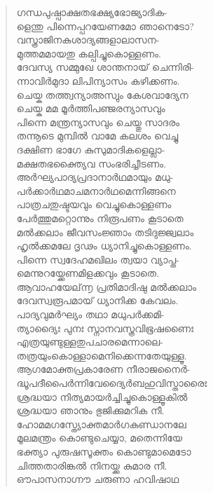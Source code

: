 \begin{verse}
ഗന്ധപുഷ്പാക്ഷതഭക്ഷ്യഭോജ്യാദിക-\\
ളെന്തു പിന്നെപ്പറയേണമോ ഞാനെടോ?\\
വസ്ത്രാജിനകുശാദ്യങ്ങളാലാസന-\\
മുത്തമമായതു കല്പിച്ചുകൊള്ളണം.\\
ദേവസ്യ സമ്മുഖേ ശാന്തനായ് ചെന്നിരി-\\
ന്നാവിര്‍മുദാ ലിപിന്യാസം കഴിക്കണം.\\
ചെയ്ക തത്ത്വന്യാഅസ്വും കേശവാദ്യേന\\
ചെയ്ക മമ മൂര്‍ത്തിപഞ്ജരന്യാസവും\\
പിന്നെ മന്ത്രന്യാസവും ചെയ്തു സാദരം\\
തന്നൂടെ മുമ്പില്‍ വാമേ കലശം വെച്ചു\\
ദക്ഷിണ ഭാഗേ കുസുമാദികളെല്ലാ-\\
മക്ഷതഭക്ത്യൈവ സംഭരിച്ചീടണം.\\
അര്‍ഘ്യപാദ്യപ്രദാനാര്‍ഥമായും മധു-\\
പര്‍ക്കാര്‍ഥമാചമനാര്‍ഥമെന്നിങ്ങനെ\\
പാത്രചതുഷ്ടയവും വെച്ചുകൊള്ളണം\\
പേര്‍ത്തുമറ്റൊന്നും നിരൂപണം കൂടാതെ\\
മല്‍ക്കലാം ജീവസംജ്ഞാം തടിദുജ്ജ്വലാം\\
ഹൃല്‍ക്കമലേ ദൃഢം ധ്യാനിച്ചുകൊള്ളണം.\\
പിന്നെ സ്വദേഹമഖിലം ത്വയാ വ്യാപ്ത-\\
മെന്നുറയ്ക്കേണമിളക്കവും കൂടാതെ.\\
ആവാഹയേല്൬ പ്രതിമാദിഷു മല്‍ക്കലാം\\
ദേവസ്വരൂപമായ് ധ്യാനിക്ക കേവലം.\\
പാദ്യവുമര്‍ഘ്യം തഥാ മധുപര്‍ക്കമി-\\
ത്യാദ്യൈഃ പുനഃ സ്നാനവസ്ത്രവിഭൂഷണൈഃ\\
എത്രയുണ്ടുള്ളതുപചാരമെന്നാലെ-\\
തത്രയുംകൊള്ളാമെനിക്കെന്നതേയുള്ളൂ.\\
ആഗമോക്തപ്രകാരേണ നീരാജനൈര്‍-\\
ദ്ധൂപദീപൈര്‍ന്നിവേദ്യൈര്‍ബഹുവിസ്താരൈഃ\\
ശ്രദ്ധയാ നിത്യമായര്‍ച്ചിച്ചുകൊള്ളൂകില്‍\\
ശ്രദ്ധയാ ഞാനും ഭുജിക്കുമറിക നീ.\\
ഹോമമഗസ്ത്യോക്തമാര്‍ഗകുണ്ഡാനലേ\\
മൂലമന്ത്രം കൊണ്ടുചെയ്യാ, മതെന്നിയേ\\
ഭക്ത്യാ പുരുഷസൂക്തം കൊണ്ടുമാമെടോ\\
ചിത്തതാരിങ്കല്‍ നിനയ്ക്ക കുമാര നീ.\\
ഔപാസനാഗ്നൗ ചരുണാ ഹവിഷാഥ\\

\end{verse}
